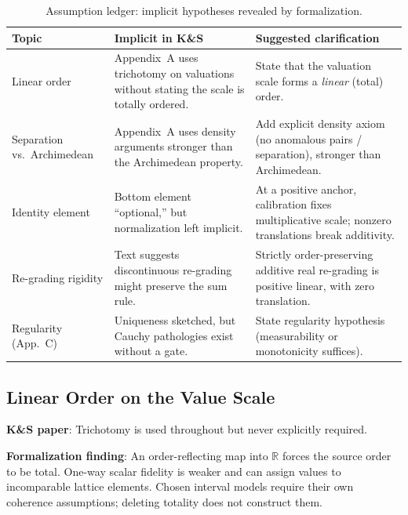\documentclass[11pt]{article}
\begin{document}
\begin{table}[ht]
\centering
\small
\renewcommand{\arraystretch}{1.4}
\begin{tabular}{@{} p{2.8cm} p{5.5cm} p{5.5cm} @{}}
\toprule
\textbf{Topic} & \textbf{Implicit in K\&S} & \textbf{Suggested clarification} \\
\midrule
Linear order &
Appendix~A uses trichotomy on valuations without stating the scale is totally ordered. &
State that the valuation scale forms a \emph{linear} (total) order. \\[4pt]

Separation vs.\ Archimedean &
Appendix~A uses density arguments stronger than the Archimedean property. &
Add explicit density axiom (no anomalous pairs / separation), stronger than Archimedean. \\[4pt]

Identity element &
Bottom element ``optional,'' but normalization left implicit. &
At a positive anchor, calibration fixes multiplicative scale; nonzero translations break additivity. \\[4pt]

Re-grading rigidity &
Text suggests discontinuous re-grading might preserve the sum rule. &
Strictly order-preserving additive real re-grading is positive linear, with zero translation. \\[4pt]

Regularity (App.~C) &
Uniqueness sketched, but Cauchy pathologies exist without a gate. &
State regularity hypothesis (measurability or monotonicity suffices). \\
\bottomrule
\end{tabular}
\caption{Assumption ledger: implicit hypotheses revealed by formalization.}
\label{tab:assumption-ledger}
\end{table}

\subsection{Linear Order on the Value Scale}

\textbf{K\&S paper}: Trichotomy is used throughout but never explicitly required.

\textbf{Formalization finding}: An order-reflecting map into $\mathbb{R}$ forces
the source order to be total. One-way scalar fidelity is weaker and can assign
values to incomparable lattice elements. Chosen interval models require their
own coherence assumptions; deleting totality does not construct them.
\end{document}
